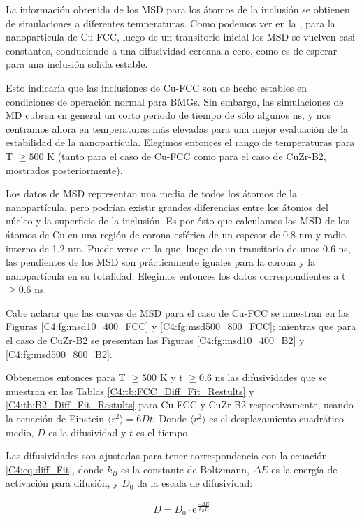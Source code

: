 La información obtenida de los MSD para los átomos de la inclusión se obtienen de simulaciones a diferentes temperaturas. Como podemos ver en la , para la nanopartícula de Cu-FCC, luego de un transitorio inicial los MSD se vuelven casi constantes, conduciendo a una difusividad cercana a cero, como es de esperar para una inclusión solida estable.

Esto indicaría que las inclusiones de Cu-FCC son de hecho estables en condiciones de operación normal para BMGs. Sin embargo, las simulaciones de MD cubren en general un corto periodo de tiempo de sólo algunos ns, y nos centramos ahora en temperaturas más elevadas para una mejor evaluación de la estabilidad de la nanopartícula. Elegimos entonces el rango de temperaturas para T $ \geq 500$ K (tanto para el caso de Cu-FCC como para el caso de CuZr-B2, mostrados posteriormente).

Los datos de MSD representan una media de todos los átomos de la nanopartícula, pero podrían existir grandes diferencias entre los átomos del núcleo y la superficie de la inclusión. Es por ésto que calculamos los MSD de los átomos de Cu en una región de corona esférica de un espesor de 0.8 nm y radio interno de 1.2 nm. Puede verse en la  que, luego de un transitorio de unos 0.6 ns, las pendientes de los MSD son prácticamente iguales para la corona y la nanopartícula en su totalidad. Elegimos entonces los datos correspondientes a t $ \geq 0.6 $ ns.

Cabe aclarar que las curvas de MSD para el caso de Cu-FCC se muestran en las Figuras \ref{C4:fg:msd10_400_FCC} y \ref{C4:fg:msd500_800_FCC}; mientras que para el caso de CuZr-B2 se presentan las Figuras \ref{C4:fg:msd10_400_B2} y \ref{C4:fg:msd500_800_B2}.

Obtenemos entonces para T $ \geq 500$ K y t $ \geq 0.6 $ ns las difusividades que se muestran en las Tablas \ref{C4:tb:FCC_Diff_Fit_Restults} y \ref{C4:tb:B2_Diff_Fit_Restults} para Cu-FCC y CuZr-B2 respectivamente, usando la ecuación de Einstein $\langle r^{2}\rangle = 6Dt$. Donde $\langle r^{2}\rangle$ es el desplazamiento cuadrático medio, $D$ es la difusividad y $t$ es el tiempo.

Las difusividades son ajustadas para tener correspondencia con la ecuación \ref{C4:eq:diff_Fit}, donde $k_{B}$ es la constante de Boltzmann, $\Delta E$ es la energía de activación para difusión, y $D_{0}$ da la escala de difusividad:

\begin{eqnarray}
D = D_{0}\cdot \mathrm{e}^{\frac{-\Delta E}{k_{B} T}}
\label{C4:eq:diff_Fit}
\end{eqnarray}


